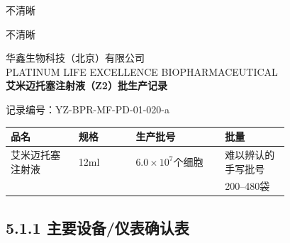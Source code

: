 \documentclass[UTF8,10pt,a4paper,fontset=fandol]{ctexart}
\newcommand{\fieldvalue}[1]{#1}
\newcommand{\handwritten}[1]{#1}
\begin{document}
\fieldvalue{\handwritten{不清晰}}

\handwritten{不清晰}

\newpage

\begin{center}
{\small 华鑫生物科技（北京）有限公司}\\
{\small PLATINUM LIFE EXCELLENCE BIOPHARMACEUTICAL}\\[2pt]
\textbf{艾米迈托塞注射液（Z2）批生产记录}
\end{center}

记录编号：YZ-BPR-MF-PD-01-020-a

\begin{center}
\begin{tabular}{|p{0.19\linewidth}|p{0.16\linewidth}|p{0.25\linewidth}|p{0.18\linewidth}|}
\hline
品名 & 规格 & 生产批号 & 批量\\
\hline
\fieldvalue{艾米迈托塞注射液} &
\fieldvalue{12ml} &
\fieldvalue{$6.0\times 10^{7}$个细胞} &
\fieldvalue{\handwritten{难以辨认的手写批号}}\\
\hline
\multicolumn{3}{r|}{} &
\fieldvalue{200--480袋}\\
\hline
\end{tabular}
\end{center}

\subsection*{5.1.1 主要设备/仪表确认表}
\end{document}
